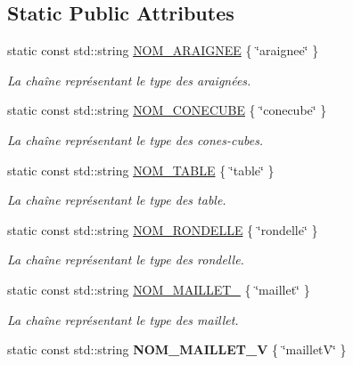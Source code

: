 \subsection*{Static Public Attributes}
\begin{DoxyCompactItemize}
\item 
static const std\+::string \hyperlink{group__inf2990_ga1035430c1c08b95d17f891ae89b33b80}{N\+O\+M\+\_\+\+A\+R\+A\+I\+G\+N\+EE} \{ \char`\"{}araignee\char`\"{} \}
\begin{DoxyCompactList}\small\item\em La chaîne représentant le type des araignées. \end{DoxyCompactList}\item 
static const std\+::string \hyperlink{group__inf2990_gae849656178f4dad34106f525bf37341a}{N\+O\+M\+\_\+\+C\+O\+N\+E\+C\+U\+BE} \{ \char`\"{}conecube\char`\"{} \}
\begin{DoxyCompactList}\small\item\em La chaîne représentant le type des cones-\/cubes. \end{DoxyCompactList}\item 
static const std\+::string \hyperlink{group__inf2990_ga89e651c1a28481ce70f473bd15555114}{N\+O\+M\+\_\+\+T\+A\+B\+LE} \{ \char`\"{}table\char`\"{} \}
\begin{DoxyCompactList}\small\item\em La chaîne représentant le type des table. \end{DoxyCompactList}\item 
static const std\+::string \hyperlink{group__inf2990_ga2ebc17f2d21cd4e66216a7d2c374493e}{N\+O\+M\+\_\+\+R\+O\+N\+D\+E\+L\+LE} \{ \char`\"{}rondelle\char`\"{} \}
\begin{DoxyCompactList}\small\item\em La chaîne représentant le type des rondelle. \end{DoxyCompactList}\item 
static const std\+::string \hyperlink{group__inf2990_ga0c6b49184808c14c52d8e4a2ee00a00e}{N\+O\+M\+\_\+\+M\+A\+I\+L\+L\+E\+T\+\_} \{ \char`\"{}maillet\char`\"{} \}
\begin{DoxyCompactList}\small\item\em La chaîne représentant le type des maillet. \end{DoxyCompactList}\item 
static const std\+::string {\bfseries N\+O\+M\+\_\+\+M\+A\+I\+L\+L\+E\+T\+\_\+V} \{ \char`\"{}mailletV\char`\"{} \}
\item 

\end{DoxyCompactItemize}
